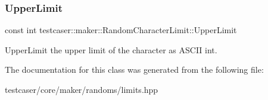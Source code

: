 \subsubsection{\texorpdfstring{UpperLimit}{UpperLimit}}
{\footnotesize\ttfamily const int testcaser\+::maker\+::\+Random\+Character\+Limit\+::\+Upper\+Limit}



Upper\+Limit the upper limit of the character as A\+S\+C\+II int. 



The documentation for this class was generated from the following file\+:\begin{DoxyCompactItemize}
\item 
testcaser/core/maker/randoms/limits.\+hpp\end{DoxyCompactItemize}
